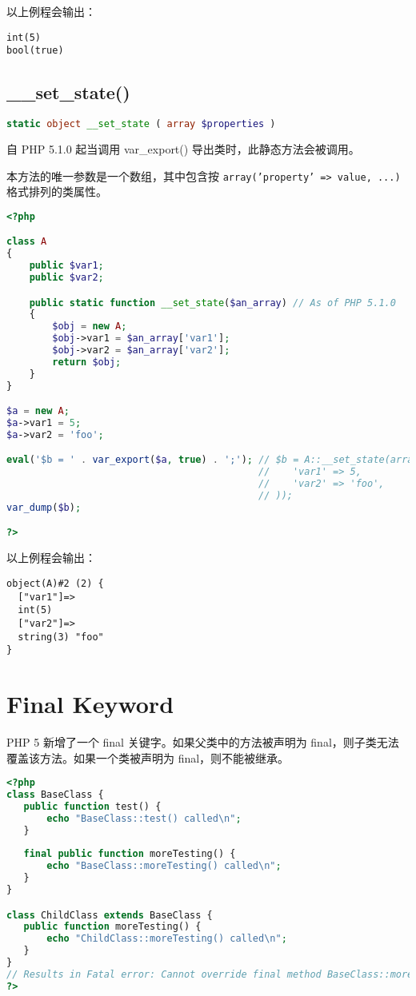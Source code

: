 以上例程会输出：

\begin{verbatim}
int(5)
bool(true)
\end{verbatim}

\section{\_\_set\_state()}


\begin{lstlisting}[language=PHP]
static object __set_state ( array $properties )
\end{lstlisting}

自 PHP 5.1.0 起当调用 var\_export() 导出类时，此静态方法会被调用。

本方法的唯一参数是一个数组，其中包含按 \texttt{array('property' => value, ...)} 格式排列的类属性。

\begin{lstlisting}[language=PHP]
<?php

class A
{
    public $var1;
    public $var2;

    public static function __set_state($an_array) // As of PHP 5.1.0
    {
        $obj = new A;
        $obj->var1 = $an_array['var1'];
        $obj->var2 = $an_array['var2'];
        return $obj;
    }
}

$a = new A;
$a->var1 = 5;
$a->var2 = 'foo';

eval('$b = ' . var_export($a, true) . ';'); // $b = A::__set_state(array(
                                            //    'var1' => 5,
                                            //    'var2' => 'foo',
                                            // ));
var_dump($b);

?>
\end{lstlisting}

以上例程会输出：

\begin{verbatim}
object(A)#2 (2) {
  ["var1"]=>
  int(5)
  ["var2"]=>
  string(3) "foo"
}
\end{verbatim}


\chapter{Final Keyword}

PHP 5 新增了一个 final 关键字。如果父类中的方法被声明为 final，则子类无法覆盖该方法。如果一个类被声明为 final，则不能被继承。

\begin{lstlisting}[language=PHP]
<?php
class BaseClass {
   public function test() {
       echo "BaseClass::test() called\n";
   }
   
   final public function moreTesting() {
       echo "BaseClass::moreTesting() called\n";
   }
}

class ChildClass extends BaseClass {
   public function moreTesting() {
       echo "ChildClass::moreTesting() called\n";
   }
}
// Results in Fatal error: Cannot override final method BaseClass::moreTesting()
?>
\end{lstlisting}


